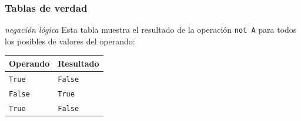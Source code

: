 \documentclass{beamer}
\begin{document}
\begin{frame}[fragile]
    \frametitle{Tablas de verdad}
    \begin{block}{{\em negación lógica}}
        Esta tabla muestra el resultado de la operación \texttt{not A} para todos los posibles de valores del operando:
        \begin{center}
            \begin{table}[]
                \begin{tabular}{@{}ll@{}}
                \toprule
                 Operando &  Resultado \\ \midrule
                 \texttt{True} & \texttt{False} \\
                 \texttt{False} & \texttt{True} \\
                 \texttt{True} & \texttt{False} \\
                 \bottomrule
                \end{tabular}
            \end{table}
        \end{center}
    \end{block}
    \end{frame}

\end{document}
